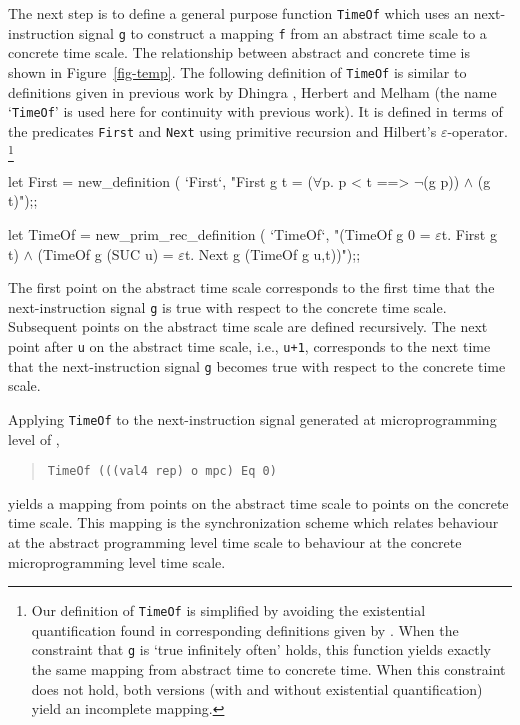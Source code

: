 The next step is to define a general purpose function \verb"TimeOf"
which uses an next-instruction signal \verb"g" to construct
a mapping \verb"f" from an abstract time scale to a concrete
time scale.
The relationship between abstract and concrete time is shown
in Figure~\ref{fig-temp}.
The following definition of \verb"TimeOf" is
similar to definitions given in previous work by
Dhingra \cite{Dhingra:thesis},
Herbert \cite{Herbert:thesis}
and Melham \cite{Melham:calgary86}
(the name `\verb"TimeOf"'
is used here for continuity with previous work).
It is defined
in terms of the predicates \verb"First"
and \verb"Next" using primitive recursion and Hilbert's
$\varepsilon$-operator.
\footnote{
Our definition of \verb"TimeOf"
is simplified by avoiding the existential quantification found
in corresponding definitions given by
\cite{Dhingra:thesis,Herbert:thesis,Melham:calgary86}.
When the constraint that \verb"g" is `true infinitely often' holds,
this function yields exactly the same mapping from abstract time
to concrete time.  When this constraint does not hold,
both versions (with and without existential quantification)
yield an incomplete mapping.}

\begintt
let First = new_definition (
  `First`,
  "First g t = (\(\forall\)p. p < t ==> \(\neg\)(g p)) \(\wedge\) (g t)");;

let TimeOf = new_prim_rec_definition (
  `TimeOf`,
  "(TimeOf g 0 = \(\varepsilon\)t. First g t) \(\wedge\)
   (TimeOf g (SUC u) = \(\varepsilon\)t. Next g (TimeOf g u,t))");;
\endtt

The first point on the abstract time scale corresponds to the first time
that the next-instruction signal \verb"g"
is true with respect to the concrete time scale.
Subsequent points on the abstract time scale are defined recursively.
The next point after \verb"u" on the abstract time scale,
i.e., \verb"u+1",
corresponds to the next time that the next-instruction signal \verb"g"
becomes true with respect to the concrete time scale.

Applying \verb"TimeOf" to the
next-instruction signal generated at microprogramming level of \Tamarack,

\begin{quote}
\verb"TimeOf (((val4 rep) o mpc) Eq 0)"
\end{quote}

\noindent
yields a mapping from
points on the abstract time scale to points on the
concrete time scale.
This mapping is the synchronization scheme which
relates behaviour at the abstract programming level time scale
to behaviour at the concrete microprogramming level time scale.

